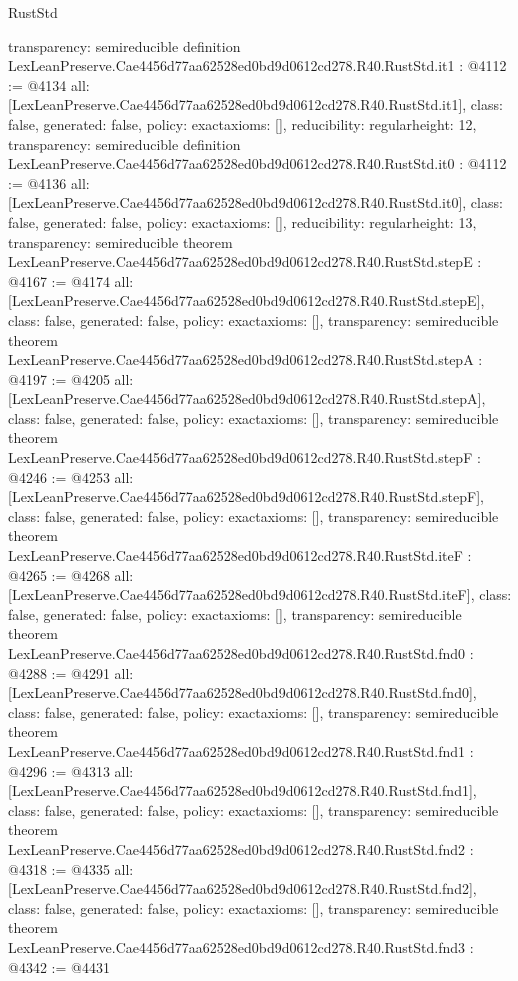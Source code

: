 \begin{lexlean}{RustStd}
\begin{coremodule}
{  transparency: semireducible
}
definition LexLeanPreserve.Cae4456d77aa62528ed0bd9d0612cd278.R40.RustStd.it1 : @4112 := @4134 {
  all: [LexLeanPreserve.Cae4456d77aa62528ed0bd9d0612cd278.R40.RustStd.it1],
  class: false,
  generated: false,
  policy: exact{axioms: []},
  reducibility: regular{height: 12},
  transparency: semireducible
}
definition LexLeanPreserve.Cae4456d77aa62528ed0bd9d0612cd278.R40.RustStd.it0 : @4112 := @4136 {
  all: [LexLeanPreserve.Cae4456d77aa62528ed0bd9d0612cd278.R40.RustStd.it0],
  class: false,
  generated: false,
  policy: exact{axioms: []},
  reducibility: regular{height: 13},
  transparency: semireducible
}
theorem LexLeanPreserve.Cae4456d77aa62528ed0bd9d0612cd278.R40.RustStd.stepE : @4167 := @4174 {
  all: [LexLeanPreserve.Cae4456d77aa62528ed0bd9d0612cd278.R40.RustStd.stepE],
  class: false,
  generated: false,
  policy: exact{axioms: []},
  transparency: semireducible
}
theorem LexLeanPreserve.Cae4456d77aa62528ed0bd9d0612cd278.R40.RustStd.stepA : @4197 := @4205 {
  all: [LexLeanPreserve.Cae4456d77aa62528ed0bd9d0612cd278.R40.RustStd.stepA],
  class: false,
  generated: false,
  policy: exact{axioms: []},
  transparency: semireducible
}
theorem LexLeanPreserve.Cae4456d77aa62528ed0bd9d0612cd278.R40.RustStd.stepF : @4246 := @4253 {
  all: [LexLeanPreserve.Cae4456d77aa62528ed0bd9d0612cd278.R40.RustStd.stepF],
  class: false,
  generated: false,
  policy: exact{axioms: []},
  transparency: semireducible
}
theorem LexLeanPreserve.Cae4456d77aa62528ed0bd9d0612cd278.R40.RustStd.iteF : @4265 := @4268 {
  all: [LexLeanPreserve.Cae4456d77aa62528ed0bd9d0612cd278.R40.RustStd.iteF],
  class: false,
  generated: false,
  policy: exact{axioms: []},
  transparency: semireducible
}
theorem LexLeanPreserve.Cae4456d77aa62528ed0bd9d0612cd278.R40.RustStd.fnd0 : @4288 := @4291 {
  all: [LexLeanPreserve.Cae4456d77aa62528ed0bd9d0612cd278.R40.RustStd.fnd0],
  class: false,
  generated: false,
  policy: exact{axioms: []},
  transparency: semireducible
}
theorem LexLeanPreserve.Cae4456d77aa62528ed0bd9d0612cd278.R40.RustStd.fnd1 : @4296 := @4313 {
  all: [LexLeanPreserve.Cae4456d77aa62528ed0bd9d0612cd278.R40.RustStd.fnd1],
  class: false,
  generated: false,
  policy: exact{axioms: []},
  transparency: semireducible
}
theorem LexLeanPreserve.Cae4456d77aa62528ed0bd9d0612cd278.R40.RustStd.fnd2 : @4318 := @4335 {
  all: [LexLeanPreserve.Cae4456d77aa62528ed0bd9d0612cd278.R40.RustStd.fnd2],
  class: false,
  generated: false,
  policy: exact{axioms: []},
  transparency: semireducible
}
theorem LexLeanPreserve.Cae4456d77aa62528ed0bd9d0612cd278.R40.RustStd.fnd3 : @4342 := @4431 {
}
\end{coremodule}
\end{lexlean}
